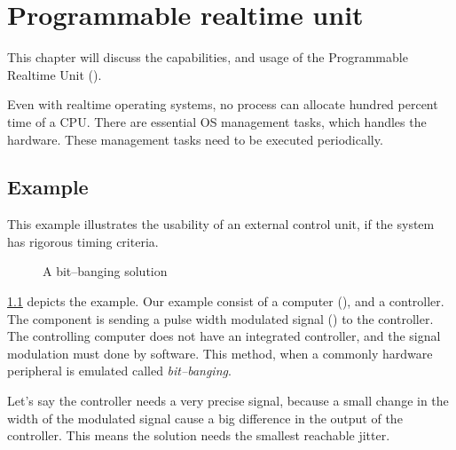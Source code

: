 \chapter{Programmable realtime unit}
\label{chap:pru}

This chapter will discuss the capabilities, and usage of the Programmable Realtime Unit ().

Even with realtime operating systems, no process can allocate hundred percent time of a CPU. There are essential OS management tasks, which handles the hardware. These management tasks need to be executed periodically.

\section{Example}
\label{subsec:example}

This example illustrates the usability of an external control unit, if the system has rigorous timing criteria.

\begin{figure}[h]
	\centering
	\caption{A bit--banging solution}
	\label{fig:example_pwm}
\end{figure}

\cref{fig:example_pwm} depicts the example. Our example consist of a computer (\rtos), and a controller. The \rtos component is sending a pulse width modulated signal (\pwm) to the controller. The controlling computer does not have an integrated \pwm controller, and the signal modulation must done by software. This method, when a commonly hardware peripheral is emulated called \emph{bit--banging}.

Let's say the controller needs a very precise signal, because a small change in the width of the modulated signal cause a big difference in the output of the controller. This means the solution needs the smallest reachable jitter.

